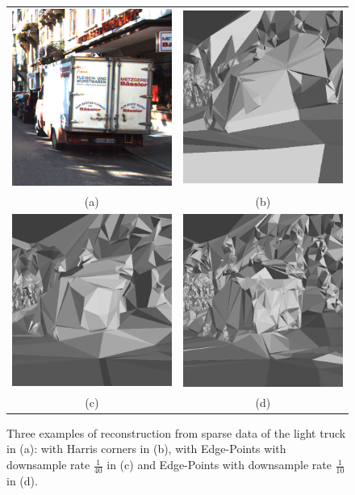 \begin{figure}
\begin{center}
\begin{tabular}{cc}
\centering
\includegraphics[width=0.3\columnwidth]{./img//imageOrig}&
\includegraphics[width=0.3\columnwidth]{./img//notedge}\\
(a) & (b)\\
\includegraphics[width=0.3\columnwidth]{./img//edge40}&
\includegraphics[width=0.3\columnwidth]{./img//edge10}\\
(c) & (d)\\
\end{tabular}
\end{center}
\caption{Three examples of reconstruction from sparse data of the light truck in (a): with Harris corners in (b), with Edge-Points with downsample rate  $\frac{1}{40}$  in (c)  and Edge-Points with  downsample rate  $\frac{1}{10}$ in (d).}
\label{fig:reconstrEx}
\end{figure}


